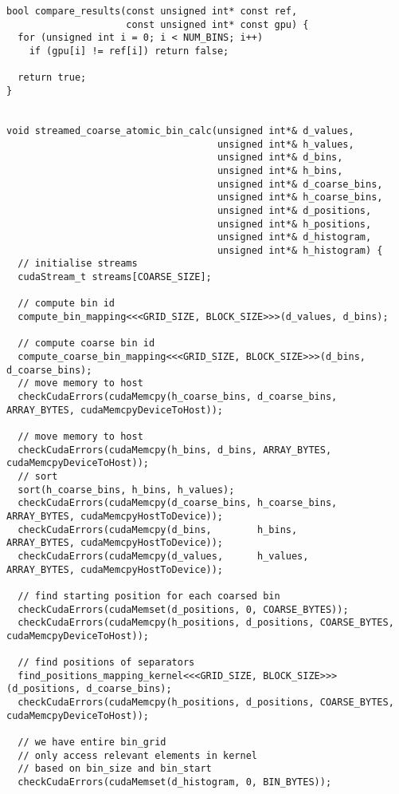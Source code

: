 \begin{lstlisting}[captionpos=t, xleftmargin=0.0pt, xrightmargin=0.0pt, caption={Coarse Histogram implementation}, label={lst:coarse histogram impl}]
bool compare_results(const unsigned int* const ref,
                     const unsigned int* const gpu) {
  for (unsigned int i = 0; i < NUM_BINS; i++)
    if (gpu[i] != ref[i]) return false;

  return true;
}


void streamed_coarse_atomic_bin_calc(unsigned int*& d_values,
                                     unsigned int*& h_values,
                                     unsigned int*& d_bins,
                                     unsigned int*& h_bins,
                                     unsigned int*& d_coarse_bins,
                                     unsigned int*& h_coarse_bins,
                                     unsigned int*& d_positions,
                                     unsigned int*& h_positions,
                                     unsigned int*& d_histogram,
                                     unsigned int*& h_histogram) {
  // initialise streams
  cudaStream_t streams[COARSE_SIZE];

  // compute bin id
  compute_bin_mapping<<<GRID_SIZE, BLOCK_SIZE>>>(d_values, d_bins);

  // compute coarse bin id
  compute_coarse_bin_mapping<<<GRID_SIZE, BLOCK_SIZE>>>(d_bins, d_coarse_bins);
  // move memory to host
  checkCudaErrors(cudaMemcpy(h_coarse_bins, d_coarse_bins, ARRAY_BYTES, cudaMemcpyDeviceToHost));

  // move memory to host
  checkCudaErrors(cudaMemcpy(h_bins, d_bins, ARRAY_BYTES, cudaMemcpyDeviceToHost));
  // sort
  sort(h_coarse_bins, h_bins, h_values);
  checkCudaErrors(cudaMemcpy(d_coarse_bins, h_coarse_bins,  ARRAY_BYTES, cudaMemcpyHostToDevice));
  checkCudaErrors(cudaMemcpy(d_bins,        h_bins,         ARRAY_BYTES, cudaMemcpyHostToDevice));
  checkCudaErrors(cudaMemcpy(d_values,      h_values,       ARRAY_BYTES, cudaMemcpyHostToDevice));

  // find starting position for each coarsed bin
  checkCudaErrors(cudaMemset(d_positions, 0, COARSE_BYTES));
  checkCudaErrors(cudaMemcpy(h_positions, d_positions, COARSE_BYTES, cudaMemcpyDeviceToHost));

  // find positions of separators
  find_positions_mapping_kernel<<<GRID_SIZE, BLOCK_SIZE>>>(d_positions, d_coarse_bins);
  checkCudaErrors(cudaMemcpy(h_positions, d_positions, COARSE_BYTES, cudaMemcpyDeviceToHost));
  
  // we have entire bin_grid
  // only access relevant elements in kernel
  // based on bin_size and bin_start
  checkCudaErrors(cudaMemset(d_histogram, 0, BIN_BYTES));


\end{lstlisting}
